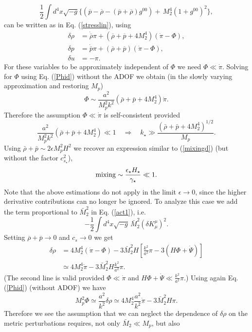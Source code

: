 \documentclass[11pt,amsmath,floats,floatfix,nofootinbib,secnumarabic, superscriptaddress, tightenlines]{revtex4}
\newcommand{\beq}{\begin{equation}}
\newcommand{\eeq}{\end{equation}}
\newcommand{\be}{\begin{equation}}
\newcommand{\ee}{\end{equation}}
\newcommand{\lb}{\left[}
\newcommand{\rb}{\right]}
\begin{document}
{\be \frac{1}{2} \int d^4 x \sqrt{-g}\{(\overline{p}-\overline{\rho}-(\overline{p}+\overline{\rho}) g^{00})+\,M_2^4 (1+ g^{00})^2\},  \ee
can be written as in Eq. (\ref{stresslin}), using
\begin{subequations}\label{var12}
\begin{align}
\delta\rho& =\dot{\overline{\rho}}\pi+(\overline{\rho}+\overline{p}+4 M_2^4)(\dot{\pi}-\Phi), \label{rho12} \\
\delta p& =\dot{\overline{p}}\pi+(\overline{\rho}+\overline{p})(\dot{\pi}-\Phi),\\
\delta u & =-\pi.
\end{align}
\end{subequations}
For these variables to be approximately independent of $\Phi$ we need  $\Phi \ll \dot\pi$.
Solving
for $\Phi$ using Eq. (\ref{Phid}) without the ADOF we obtain (in the slowly varying approximation and restoring $M_p$)
\beq
\Phi\sim \frac{a^2}{M_p^2k^2}\left(\bar\rho+\bar p + 4 M_2^4\right)\dot\pi . 
\eeq
Therefore the assumption  $\Phi \ll \dot\pi$  is self-consistent provided
\beq
\label{m2ks}
\frac{a^2}{M_p^2k^2} (\bar\rho+\bar p + 4 M_2^4) \ll 1 \quad \Rightarrow\quad k_\star \gg \frac{(\bar\rho+\bar p + 4 M_2^4)^{1/2}}{M_p}.
\eeq
Using $\bar\rho+\bar p \sim 2\epsilon M_p^2H^2$ we recover an expression similar to (\ref{mixingd}) (but without the factor  $c_{s_\star}^2$),
\beq
{\rm mixing} \sim \frac{\epsilon_\star H_\star }{\gamma_\star} \ll 1 \label{mixingd2}.
\eeq
Note that the above estimations do not apply  in the limit $\epsilon \to 0$, since the higher derivative contributions
can no longer be ignored. To analyze this case we add the term proportional to $\bar M_2^2$ in  Eq. (\ref{act1}), i.e.
\beq
-\frac{1}{2}\int d^4 x \sqrt{-g}\,\bar{M}_2^2 (\delta K_{\mu}^{\mu})^2.
\eeq
Setting $\overline{\rho}+\overline{p}\to 0$ and $c_s\to 0$ we get
\begin{subequations}
\begin{align}
\delta\rho &=4 M_2^4(\dot{\pi}-\Phi)-3\bar{M}_2^2 H\lb\frac{k^2}{a^2}\pi-3 (H\Phi+\dot{\Psi})\rb\\
&\simeq 4 M_2^4\dot{\pi}-3\bar{M}_2^2 H\frac{k^2}{a^2}\pi.
\end{align}
\end{subequations} (The second line is valid provided $\Phi \ll \dot{\pi}$ and $H\Phi+\dot{\Psi}\ll \frac{k^2}{a^2}\pi$.)
Using  again Eq. (\ref{Phid}) (without ADOF) we have
\beq
M_p^2\Phi\simeq \frac{a^2}{k^2}\delta\rho\simeq 4 M_2^4 \frac{a^2}{k^2}\dot{\pi}-3\bar{M}_2^2 H\pi .
\eeq
Therefore we see the assumption that we can neglect the dependence of $\delta\rho$ on the metric perturbations requires, not only $\bar{M}_2 \ll M_p$, but also~\cite{eft1}
}
\end{document}
